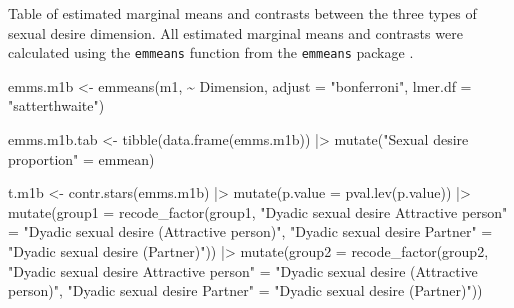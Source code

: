 \documentclass[
  bookmarksnumbered]{article}
\newenvironment{Shaded}{\begin{snugshade}}{\end{snugshade}}
\newcommand{\AttributeTok}[1]{\textcolor[rgb]{0.80,0.80,0.80}{#1}}
\newcommand{\FunctionTok}[1]{\textcolor[rgb]{0.94,0.94,0.56}{#1}}
\newcommand{\NormalTok}[1]{\textcolor[rgb]{0.80,0.80,0.80}{#1}}
\newcommand{\OtherTok}[1]{\textcolor[rgb]{0.94,0.94,0.56}{#1}}
\newcommand{\SpecialCharTok}[1]{\textcolor[rgb]{0.86,0.64,0.64}{#1}}
\newcommand{\StringTok}[1]{\textcolor[rgb]{0.80,0.58,0.58}{#1}}
\begin{document}
Table of estimated marginal means and contrasts between the three types of sexual desire dimension. All estimated marginal means and contrasts were calculated using the \texttt{emmeans} function from the \texttt{emmeans} package \autocite{emmeanscit}.

\begin{Shaded}
\begin{Highlighting}[]
\NormalTok{emms.m1b }\OtherTok{\textless{}{-}} \FunctionTok{emmeans}\NormalTok{(m1, }\SpecialCharTok{\textasciitilde{}}\NormalTok{ Dimension,}
                    \AttributeTok{adjust =} \StringTok{"bonferroni"}\NormalTok{,}
                    \AttributeTok{lmer.df =} \StringTok{"satterthwaite"}\NormalTok{)}

\NormalTok{emms.m1b.tab }\OtherTok{\textless{}{-}} \FunctionTok{tibble}\NormalTok{(}\FunctionTok{data.frame}\NormalTok{(emms.m1b)) }\SpecialCharTok{|\textgreater{}}
  \FunctionTok{mutate}\NormalTok{(}\StringTok{"Sexual desire proportion"} \OtherTok{=}\NormalTok{ emmean)}

\NormalTok{t.m1b }\OtherTok{\textless{}{-}} \FunctionTok{contr.stars}\NormalTok{(emms.m1b) }\SpecialCharTok{|\textgreater{}} 
  \FunctionTok{mutate}\NormalTok{(}\AttributeTok{p.value =} \FunctionTok{pval.lev}\NormalTok{(p.value)) }\SpecialCharTok{|\textgreater{}}
  \FunctionTok{mutate}\NormalTok{(}\AttributeTok{group1 =} \FunctionTok{recode\_factor}\NormalTok{(group1,}
                                \StringTok{"Dyadic sexual desire Attractive person"} \OtherTok{=} 
                                  \StringTok{"Dyadic sexual desire (Attractive person)"}\NormalTok{,}
                                \StringTok{"Dyadic sexual desire Partner"} \OtherTok{=} 
                                  \StringTok{"Dyadic sexual desire (Partner)"}\NormalTok{)) }\SpecialCharTok{|\textgreater{}}
  \FunctionTok{mutate}\NormalTok{(}\AttributeTok{group2 =} \FunctionTok{recode\_factor}\NormalTok{(group2,}
                                \StringTok{"Dyadic sexual desire Attractive person"} \OtherTok{=} 
                                  \StringTok{"Dyadic sexual desire (Attractive person)"}\NormalTok{,}
                                \StringTok{"Dyadic sexual desire Partner"} \OtherTok{=} 
                                  \StringTok{"Dyadic sexual desire (Partner)"}\NormalTok{))}


\end{Highlighting}
\end{Shaded}
\end{document}
